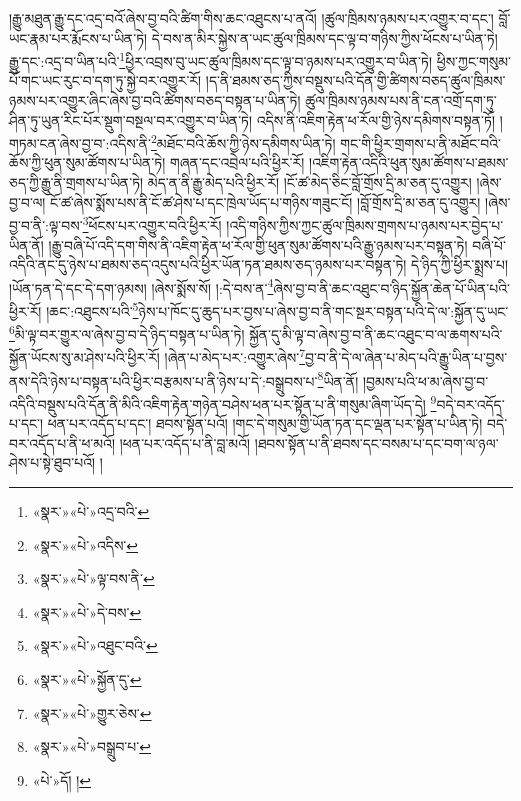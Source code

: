 །རྒྱུ་མཐུན་རྒྱུ་དང་འདྲ་བའོ་ཞེས་བྱ་བའི་ཚིག་གིས་ཆང་འཐུངས་པ་ནའོ། །ཚུལ་ཁྲིམས་ཉམས་པར་འགྱུར་བ་དང་། བློ་ཡང་རྣམ་པར་རྨོངས་པ་ཡིན་ཏེ། དེ་བས་ན་མིར་སྐྱེས་ན་ཡང་ཚུལ་ཁྲིམས་དང་ལྟ་བ་གཉིས་ཀྱིས་ཕོངས་པ་ཡིན་ཏེ། རྒྱུ་དང་:འདྲ་བ་ཡིན་པའི་\footnote{«སྣར་»«པེ་»འདྲ་བའི་}ཕྱིར་འབྲས་བུ་ཡང་ཚུལ་ཁྲིམས་དང་ལྟ་བ་ཉམས་པར་འགྱུར་བ་ཡིན་ཏེ། ཕྱིས་ཀྱང་གསུམ་པོ་གང་ཡང་རུང་བ་དག་ཏུ་སྐྱེ་བར་འགྱུར་རོ། །ད་ནི་ཐམས་ཅད་ཀྱིས་བསྡུས་པའི་དོན་གྱི་ཚིགས་བཅད་ཚུལ་ཁྲིམས་ཉམས་པར་འགྱུར་ཞིང་ཞེས་བྱ་བའི་ཚིགས་བཅད་བསྟན་པ་ཡིན་ཏེ། ཚུལ་ཁྲིམས་ཉམས་པས་ནི་ངན་འགྲོ་དག་ཏུ་ཤིན་ཏུ་ཡུན་རིང་པོར་སྡུག་བསྔལ་བར་འགྱུར་བ་ཡིན་ཏེ། འདིས་ནི་འཇིག་རྟེན་ཕ་རོལ་གྱི་ཉེས་དམིགས་བསྟན་ཏོ། །གཏམ་ངན་ཞེས་བྱ་བ་:འདིས་ནི་\footnote{«སྣར་»«པེ་»འདིས་}མཐོང་བའི་ཆོས་ཀྱི་ཉེས་དམིགས་ཡིན་ཏེ། གང་གི་ཕྱིར་གྲགས་པ་ནི་མཐོང་བའི་ཆོས་ཀྱི་ཕུན་སུམ་ཚོགས་པ་ཡིན་ཏེ། གཞན་དང་འབྲེལ་པའི་ཕྱིར་རོ། །འཇིག་རྟེན་འདིའི་ཕུན་སུམ་ཚོགས་པ་ཐམས་ཅད་ཀྱི་རྒྱུ་ནི་གྲགས་པ་ཡིན་ཏེ། མེད་ན་ནི་རྒྱུ་མེད་པའི་ཕྱིར་རོ། །ངོ་ཚ་མེད་ཅིང་བློ་གྲོས་དྲི་མ་ཅན་དུ་འགྱུར། །ཞེས་བྱ་བ་ལ། ངོ་ཚ་ཞེས་སྨོས་པས་ནི་ངོ་ཚ་ཤེས་པ་དང་ཁྲེལ་ཡོད་པ་གཉིས་གཟུང་ངོ། །བློ་གྲོས་དྲི་མ་ཅན་དུ་འགྱུར། །ཞེས་བྱ་བ་ནི་:ལྟ་བས་\footnote{«སྣར་»«པེ་»ལྟ་བས་ནི་}ཕོངས་པར་འགྱུར་བའི་ཕྱིར་རོ། །འདི་གཉིས་ཀྱིས་ཀྱང་ཚུལ་ཁྲིམས་གྲགས་པ་ཉམས་པར་བྱེད་པ་ཡིན་ནོ། །རྒྱུ་བཞི་པོ་འདི་དག་གིས་ནི་འཇིག་རྟེན་ཕ་རོལ་གྱི་ཕུན་སུམ་ཚོགས་པའི་རྒྱུ་ཉམས་པར་བསྟན་ཏེ། བཞི་པོ་འདིའི་ནང་དུ་ཉེས་པ་ཐམས་ཅད་འདུས་པའི་ཕྱིར་ཡོན་ཏན་ཐམས་ཅད་ཉམས་པར་བསྟན་ཏེ། དེ་ཉིད་ཀྱི་ཕྱིར་སྨྲས་པ། །ཡོན་ཏན་དེ་དང་དེ་དག་ཉམས། །ཞེས་སྨོས་སོ། །:དེ་བས་ན་\footnote{«སྣར་»«པེ་»དེ་བས་}ཞེས་བྱ་བ་ནི་ཆང་འཐུང་བ་ཉིད་སྐྱོན་ཆེན་པོ་ཡིན་པའི་ཕྱིར་རོ། །ཆང་:འཐུངས་པའི་\footnote{«སྣར་»«པེ་»འཐུང་བའི་}ཉེས་པ་ཁོང་དུ་ཆུད་པར་བྱས་པ་ཞེས་བྱ་བ་ནི་གང་སྔར་བསྟན་པའི་དེ་ལ་:སྐྱོན་དུ་ཡང་\footnote{«སྣར་»«པེ་»སྐྱོན་དུ་}མི་ལྟ་བར་གྱུར་ལ་ཞེས་བྱ་བ་དེ་ཉིད་བསྟན་པ་ཡིན་ཏེ། སྐྱོན་དུ་མི་ལྟ་བ་ཞེས་བྱ་བ་ནི་ཆང་འཐུང་བ་ལ་ཆགས་པའི་སྐྱོན་ཡོངས་སུ་མ་ཤེས་པའི་ཕྱིར་རོ། །ཞེན་པ་མེད་པར་:འགྱུར་ཞེས་\footnote{«སྣར་»«པེ་»གྱུར་ཅེས་}བྱ་བ་ནི་དེ་ལ་ཞེན་པ་མེད་པའི་རྒྱུ་ཡིན་པ་བྱས་ནས་དེའི་ཉེས་པ་བསྟན་པའི་ཕྱིར་བརྩམས་པ་ནི་ཉེས་པ་དེ་:བསྒྲུབས་པ་\footnote{«སྣར་»«པེ་»བསྒྲུབ་པ་}ཡིན་ནོ། །བྱམས་པའི་ཕ་མ་ཞེས་བྱ་བ་འདིའི་བསྡུས་པའི་དོན་ནི་མིའི་འཇིག་རྟེན་གཉེན་བཤེས་ཕན་པར་སྟོན་པ་ནི་གསུམ་ཞིག་ཡོད་དེ། \footnote{«པེ་»དོ། ། }བདེ་བར་འདོད་པ་དང་། ཕན་པར་འདོད་པ་དང་། ཐབས་སྟོན་པའོ། །གང་དེ་གསུམ་གྱི་ཡོན་ཏན་དང་ལྡན་པར་སྟོན་པ་ཡིན་ཏེ། བདེ་བར་འདོད་པ་ནི་ཕ་མའོ། །ཕན་པར་འདོད་པ་ནི་བླ་མའོ། །ཐབས་སྟོན་པ་ནི་ཐབས་དང་བསམ་པ་དང་བག་ལ་ཉལ་ཤེས་པ་སྟེ་ཐུབ་པའོ། །
